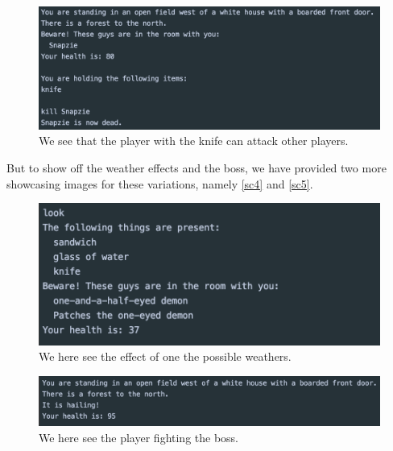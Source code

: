 \begin{figure}[H]
	\centering
	\includegraphics[width=0.8\linewidth]{Materials/Results/AttackingPlayer}
	\caption{We see that the player with the knife can attack other players.}
	\label{sc3}
\end{figure}

But to show off the weather effects and the boss, we have provided two more showcasing images for these variations, namely \autoref{sc4} and \autoref{sc5}.

\begin{figure}[H]
	\centering
	\includegraphics[width=0.7\linewidth]{Materials/Results/Boss}
	\caption{We here see the effect of one the possible weathers.}
	\label{sc4}
\end{figure}

\begin{figure}[H]
	\centering
	\includegraphics[width=0.9\linewidth]{Materials/Results/Weather}
	\caption{We here see the player fighting the boss.}
	\label{sc5}
\end{figure}

